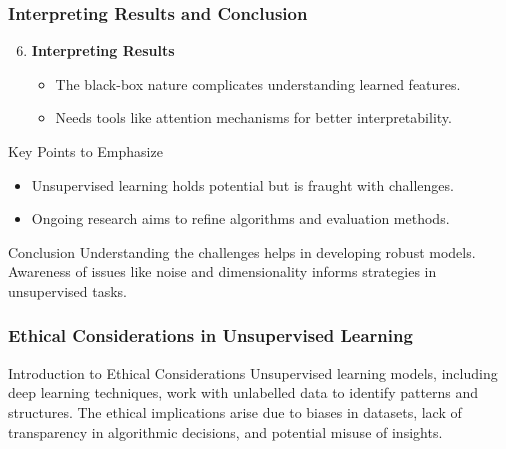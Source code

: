 \documentclass[aspectratio=169]{beamer}
\begin{document}
\begin{frame}[fragile]
    \frametitle{Interpreting Results and Conclusion}
    
    \begin{enumerate}
        \setcounter{enumi}{5}
        \item \textbf{Interpreting Results}
        \begin{itemize}
            \item The black-box nature complicates understanding learned features.
            \item Needs tools like attention mechanisms for better interpretability.
        \end{itemize}
    \end{enumerate}
    
    \begin{block}{Key Points to Emphasize}
        \begin{itemize}
            \item Unsupervised learning holds potential but is fraught with challenges.
            \item Ongoing research aims to refine algorithms and evaluation methods.
        \end{itemize}
    \end{block}
    
    \begin{block}{Conclusion}
        Understanding the challenges helps in developing robust models. Awareness of issues like noise and dimensionality informs strategies in unsupervised tasks.
    \end{block}
\end{frame}

\begin{frame}[fragile]
    \frametitle{Ethical Considerations in Unsupervised Learning}
    
    \begin{block}{Introduction to Ethical Considerations}
        Unsupervised learning models, including deep learning techniques, work with unlabelled data to identify patterns and structures. 
        The ethical implications arise due to biases in datasets, lack of transparency in algorithmic decisions, and potential misuse of insights.
    \end{block}

\end{frame}
\end{document}
